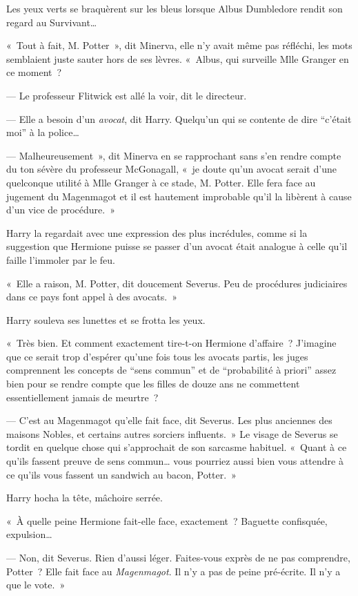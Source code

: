 Les yeux verts se braquèrent sur les bleus lorsque Albus Dumbledore rendit son regard au Survivant…

«~Tout à fait, M. Potter~», dit Minerva, elle n'y avait même pas réfléchi, les mots semblaient juste sauter hors de ses lèvres. «~Albus, qui surveille Mlle Granger en ce moment~?

--- Le professeur Flitwick est allé la voir, dit le directeur.

--- Elle a besoin d'un \emph{avocat}, dit Harry. Quelqu'un qui se contente de dire “c'était moi” à la police…

--- Malheureusement~», dit Minerva en se rapprochant sans s'en rendre compte du ton sévère du professeur McGonagall, «~je doute qu'un avocat serait d'une quelconque utilité à Mlle Granger à ce stade, M. Potter. Elle fera face au jugement du Magenmagot et il est hautement improbable qu'il la libèrent à cause d'un vice de procédure.~»

Harry la regardait avec une expression des plus incrédules, comme si la suggestion que Hermione puisse se passer d'un avocat était analogue à celle qu'il faille l'immoler par le feu.

«~Elle a raison, M. Potter, dit doucement Severus. Peu de procédures judiciaires dans ce pays font appel à des avocats.~»

Harry souleva ses lunettes et se frotta les yeux.

«~Très bien. Et comment exactement tire-t-on Hermione d'affaire~? J'imagine que ce serait trop d'espérer qu'une fois tous les avocats partis, les juges comprennent les concepts de “sens commun” et de “probabilité à priori” assez bien pour se rendre compte que les filles de douze ans ne commettent essentiellement jamais de meurtre~?

--- C'est au Magenmagot qu'elle fait face, dit Severus. Les plus anciennes des maisons Nobles, et certains autres sorciers influents.~» Le visage de Severus se tordit en quelque chose qui s'approchait de son sarcasme habituel. «~Quant à ce qu'ils fassent preuve de sens commun… vous pourriez aussi bien vous attendre à ce qu'ils vous fassent un sandwich au bacon, Potter.~»

Harry hocha la tête, mâchoire serrée.

«~À quelle peine Hermione fait-elle face, exactement~? Baguette confisquée, expulsion…

--- Non, dit Severus. Rien d'aussi léger. Faites-vous exprès de ne pas comprendre, Potter~? Elle fait face au \emph{Magenmagot}. Il n'y a pas de peine pré-écrite. Il n'y a que le vote.~»

